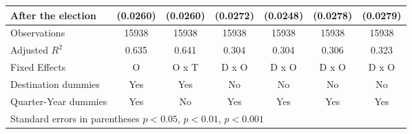 \begin{table}[!ht]
\begin{tabular}{l*{6}{c}}
 After the election                    &    (0.0260)         &    (0.0260)         &    (0.0272)         &    (0.0248)         &    (0.0278)         &    (0.0279)         \\
\hline
Observations        &       15938         &       15938         &       15938         &       15938         &       15938         &       15938         \\
Adjusted \(R^{2}\)  &       0.635         &       0.641         &       0.304         &       0.304         &       0.306         &       0.323         \\
Fixed Effects       &           O         &       O x T         &       D x O         &       D x O         &       D x O         &       D x O         \\
Destination dummies &         Yes         &         Yes         &          No         &          No         &          No         &          No         \\
Quarter-Year dummies&         Yes         &          No         &         Yes         &         Yes         &         Yes         &         Yes         \\
\hline\hline
\multicolumn{7}{l}{ Standard errors in parentheses \sym{*} \(p<0.05\), \sym{**} \(p<0.01\), \sym{***} \(p<0.001\)}\\
\end{tabular}
\end{table}
